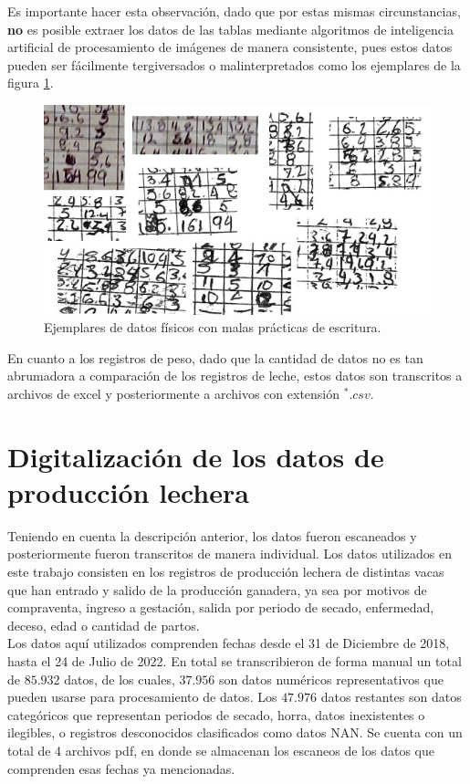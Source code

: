 Es importante hacer esta observación, dado que por estas mismas circunstancias, \textbf{no} es posible extraer los datos de las tablas mediante algoritmos de inteligencia artificial de procesamiento de imágenes de manera consistente, pues estos datos pueden ser fácilmente tergiversados o malinterpretados como los ejemplares de la figura \ref{datosamanopng}.

\begin{figure}[H]
	 \begin{center}
	 \includegraphics[scale=1.05]{img/datosamano.jpg}
	 \end{center}
	 \caption{Ejemplares de datos físicos con malas prácticas de escritura. \label{datosamanopng}}
\end{figure}

En cuanto a los registros de peso, dado que la cantidad de datos no es tan abrumadora a comparación de los registros de leche, estos datos son transcritos a archivos de excel y posteriormente a archivos con extensión $^{*}.csv$.

\section{Digitalización de los datos de producción lechera}

Teniendo en cuenta la descripción anterior, los datos fueron escaneados y posteriormente fueron transcritos de manera individual. Los datos utilizados en este trabajo consisten en los registros de producción lechera de distintas vacas que han entrado y salido de la producción ganadera, ya sea por motivos de compraventa, ingreso a gestación, salida por periodo de secado,  enfermedad, deceso, edad o cantidad de partos.\\

Los datos aquí utilizados comprenden fechas desde el 31 de Diciembre de 2018, hasta el 24 de Julio de 2022. En total se transcribieron de forma manual un total de $85.932$  datos, de los cuales, $37.956$ son datos numéricos representativos que pueden usarse para procesamiento de datos. Los $47.976$ datos restantes son datos categóricos que representan periodos de secado, horra, datos inexistentes o ilegibles, o registros desconocidos clasificados como datos NAN. Se cuenta con un total de 4 archivos pdf, en donde se almacenan los escaneos de los datos que comprenden esas fechas ya mencionadas.\\

